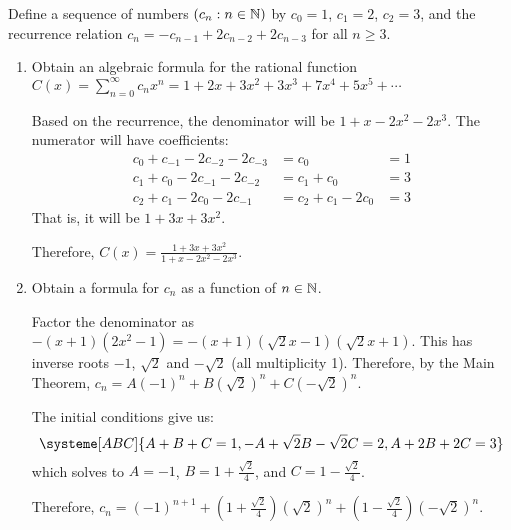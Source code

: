 \begin{xca}
  Define a sequence of numbers $(c_n : n \in \mathbb{N})$ by
  $c_0 = 1$, $c_1 = 2$, $c_2 = 3$, and the recurrence relation
  $c_n = -c_{n-1} + 2c_{n-2} + 2c_{n-3}$ for all $n \geq 3$.
\end{xca}
\begin{enumerate}
  \item Obtain an algebraic formula for the rational function
        $C(x) = \sum_{n=0}^\infty c_n x^n = 1 + 2x + 3x^2 + 3x^3 + 7x^4 + 5x^5 + \dotsb$
        \begin{sol}
          Based on the recurrence, the denominator will be $1 + x - 2x^2 - 2x^3$.
          The numerator will have coefficients:
          \begin{align*}
            c_0 + c_{-1} - 2c_{-2} - 2c_{-3} & = c_0              & = 1 \\
            c_1 + c_{0} - 2c_{-1} - 2c_{-2}  & = c_1 + c_0        & = 3 \\
            c_2 + c_{1} - 2c_{0} - 2c_{-1}   & = c_2 + c_1 - 2c_0 & = 3
          \end{align*}
          That is, it will be $1 + 3x + 3x^2$.

          Therefore, $C(x) = \frac{1+3x+3x^2}{1+x-2x^2-2x^3}$.
        \end{sol}
  \item Obtain a formula for $c_n$ as a function of $n \in \mathbb{N}$.
        \begin{sol}
          Factor the denominator as $-(x+1)(2x^2-1) = -(x+1)(\sqrt{2}x-1)(\sqrt{2}x+1)$.
          This has inverse roots $-1$, $\sqrt{2}$ and $-\sqrt{2}$ (all multiplicity 1).
          Therefore, by the Main Theorem, $c_n = A(-1)^n + B(\sqrt{2})^n + C(-\sqrt{2})^n$.

          The initial conditions give us:
          \[
            \systeme[ABC]{A+B+C = 1, -A + {\sqrt{2}}B - {\sqrt{2}}C = 2, A + 2B + 2C = 3}
          \]
          which solves to $A = -1$, $B = 1 + \frac{\sqrt{2}}{4}$, and $C = 1 - \frac{\sqrt{2}}{4}$.

          Therefore, $c_n = (-1)^{n+1} + (1+\frac{\sqrt{2}}{4})(\sqrt{2})^n + (1-\frac{\sqrt{2}}{4})(-\sqrt{2})^n$.
        \end{sol}
\end{enumerate}

